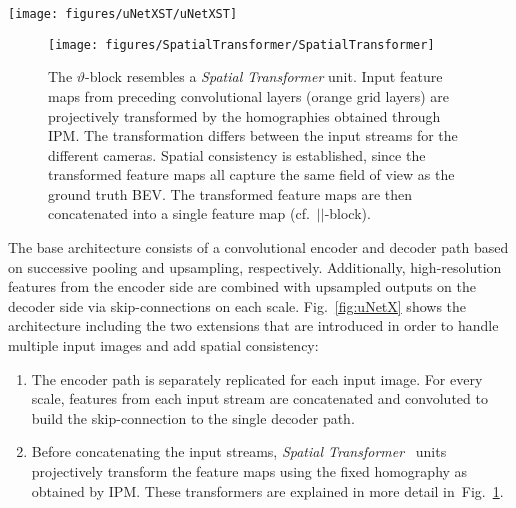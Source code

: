 \documentclass[a4paper, 10pt, conference]{ieeeconf}
\newcommand{\fig}[1]{Fig.~\ref{#1}}
\begin{document}
\begin{figure*}[t]
  \centering
  \texttt{[image: figures/uNetXST/uNetXST]}
  \captionsetup{width=0.65\textwidth}
  \caption{The \textit{uNetXST} architecture has separate encoder paths for each input image (green paths). As part of the skip-connection on each scale level (violet paths), feature maps are projectively transformed (\( \vartheta \)-block), concatenated with the other input streams (\( \vert\vert \)-block), convoluted, and finally concatenated with upsampled output of the decoder path. This illustration shows a network with only two pooling and two upsampling layers, the actual trained network contains four, respectively.}
  \label{fig:uNetX}
\end{figure*}

\begin{figure}[!b]
  \centering
  \texttt{[image: figures/SpatialTransformer/SpatialTransformer]}
  \caption{The \( \vartheta \)-block resembles a \textit{Spatial Transformer} unit. Input feature maps from preceding convolutional layers (orange grid layers) are projectively transformed by the homographies obtained through IPM. The transformation differs between the input streams for the different cameras. Spatial consistency is established, since the transformed feature maps all capture the same field of view as the ground truth BEV. The transformed feature maps are then concatenated into a single feature map (cf.\ \( \vert\vert \)-block).}
  \label{fig:SpatialTransformer}
\end{figure}

The base architecture consists of a convolutional encoder and decoder path based on successive pooling and upsampling, respectively. Additionally, high-resolution features from the encoder side are combined with upsampled outputs on the decoder side via skip-connections on each scale. \fig{fig:uNetX} shows the architecture including the two extensions that are introduced in order to handle multiple input images and add spatial consistency:
\begin{enumerate}
  \item The encoder path is separately replicated for each input image. For every scale, features from each input stream are concatenated and convoluted to build the skip-connection to the single decoder path.
  \item Before concatenating the input streams, \textit{Spatial Transformer}~\cite{JaderbergEtAl_SpatialTransformerNetworks_2015} units projectively transform the feature maps using the fixed homography as obtained by IPM. These transformers are explained in more detail in~\fig{fig:SpatialTransformer}.
\end{enumerate}
\end{document}
